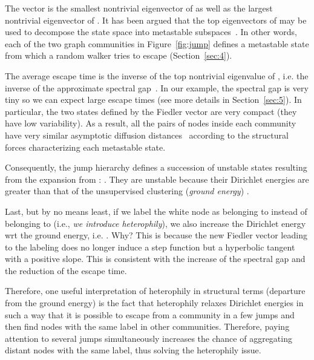 \documentclass{article}
\theoremstyle{plain}
\theoremstyle{definition}
\begin{document}
The vector  is the smallest nontrivial eigenvector of  as well as the largest nontrivial eigenvector of . It has been argued that the top eigenvectors of  may be used to decompose the state space into metastable subspaces~\citep{meta04}. In other words, each of the two graph communities in Figure~\ref{fig:jump} defines a metastable state from which a random walker tries to escape (Section~\ref{sec:4}). 

The average escape time is the inverse of the top nontrivial eigenvalue of , i.e. the inverse of the approximate spectral gap~\citep{siam81}\citep{Kramers90}\citep{sclimitations06}. In our example, the spectral gap is very tiny so we can expect large escape times (see more details in Section~\ref{sec:5}). In particular, the two states defined by the Fiedler vector are very compact (they have low variability). As a result, all the pairs of nodes  inside each community have very similar asymptotic diffusion distances~\citep{difmaps05}  according to the structural forces characterizing each metastable state.
    
Consequently, the jump hierarchy defines a succession of unstable states  resulting from the expansion from : . They are unstable because their Dirichlet energies  are greater than that of the unsupervised clustering (\emph{ground energy}) .

Last, but by no means least, if we label the white node as belonging to  instead of belonging to  (i.e., \emph{we introduce heterophily}), we also increase the Dirichlet energy wrt the ground energy, i.e. . Why? This is because the new Fiedler vector  leading to the labeling  does no longer induce a step function but a hyperbolic tangent with a positive slope. This is consistent with the increase of the spectral gap and the reduction of the escape time. 

Therefore, one useful interpretation of heterophily in structural terms (departure from the ground energy) is the fact that heterophily relaxes Dirichlet energies in such a way that it is possible to escape from a community in a few jumps and then find nodes with the same label in other communities. Therefore, paying attention to several jumps simultaneously increases the chance of aggregating distant nodes with the same label, thus solving the heterophily issue. 
\end{document}
